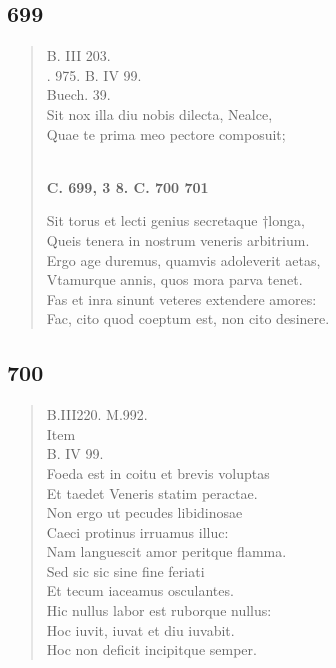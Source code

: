 \documentclass[11pt, a4paper]{report}
\begin{document}
            \subsection*{699}
      \begin{verse}
      B. III 203. \\ . 975. B. IV 99. \\ Buech. 39. \\ Sit nox illa diu nobis dilecta, Nealce, \\ Quae te prima meo pectore composuit; \\ 
        ﻿\pagebreak 
    \begin{center} \textbf{C. 699, 3 8. C. 700 701} \end{center} \marginpar{[171]} Sit torus et lecti genius secretaque †longa, \\ Queis tenera in nostrum veneris arbitrium. \\ Ergo age duremus, quamvis adoleverit aetas, \\ Vtamurque annis, quos mora parva tenet. \\ Fas et inra sinunt veteres extendere amores: \\ Fac, cito quod coeptum est, non cito desinere. \\ 
      \end{verse}
  
            \subsection*{700}
      \begin{verse}
      B.III220. M.992. \\  \lbrack Item \rbrack  \\ B. IV 99. \\ Foeda est in coitu et brevis voluptas \\ Et taedet Veneris statim peractae. \\ Non ergo ut pecudes libidinosae \\ Caeci protinus irruamus illuc: \\ Nam languescit amor peritque flamma. \\ Sed sic sic sine fine feriati \\ Et tecum iaceamus osculantes. \\ Hic nullus labor est ruborque nullus: \\ Hoc iuvit, iuvat et diu iuvabit. \\ Hoc non deficit incipitque semper. \\ 
      \end{verse}
  
\end{document}
